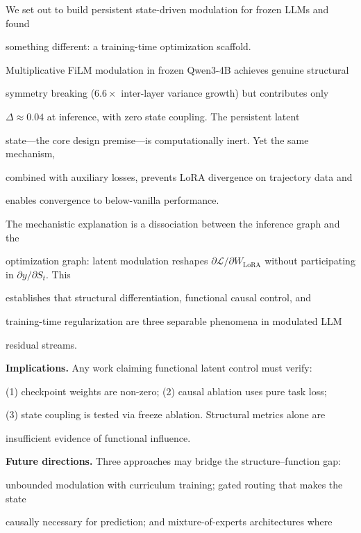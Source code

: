 \documentclass[11pt,a4paper]{article}
\begin{document}



We set out to build persistent state-driven modulation for frozen LLMs and found

something different: a training-time optimization scaffold.



Multiplicative FiLM modulation in frozen Qwen3-4B achieves genuine structural

symmetry breaking ($6.6\times$ inter-layer variance growth) but contributes only

$\Delta \approx 0.04$ at inference, with zero state coupling. The persistent latent

state---the core design premise---is computationally inert. Yet the same mechanism,

combined with auxiliary losses, prevents LoRA divergence on trajectory data and

enables convergence to below-vanilla performance.



The mechanistic explanation is a dissociation between the inference graph and the

optimization graph: latent modulation reshapes $\partial \mathcal{L} / \partial

W_{\mathrm{LoRA}}$ without participating in $\partial y / \partial S_t$. This

establishes that structural differentiation, functional causal control, and

training-time regularization are three separable phenomena in modulated LLM

residual streams.



\textbf{Implications.} Any work claiming functional latent control must verify:

(1) checkpoint weights are non-zero; (2) causal ablation uses pure task loss;

(3) state coupling is tested via freeze ablation. Structural metrics alone are

insufficient evidence of functional influence.



\textbf{Future directions.} Three approaches may bridge the structure--function gap:

unbounded modulation with curriculum training; gated routing that makes the state

causally necessary for prediction; and mixture-of-experts architectures where
\end{document}
